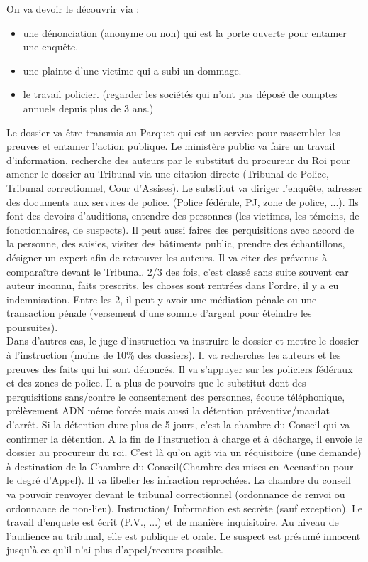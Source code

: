 \documentclass{book}
\begin{document}
On va devoir le découvrir via :

\begin{itemize}
\item une dénonciation (anonyme ou non) qui est la porte ouverte pour entamer une enquête.
\item une plainte d'une victime qui a subi un dommage.
\item le travail policier. (regarder les sociétés qui n'ont pas déposé de comptes annuels depuis plus de 3 ans.)
\end{itemize}

Le dossier va être transmis au Parquet qui est un service pour rassembler les preuves et entamer l'action publique. Le ministère public va faire un travail d'information, recherche des auteurs par le substitut du procureur du Roi pour amener le dossier au Tribunal via une citation directe (Tribunal de Police, Tribunal correctionnel, Cour d'Assises). Le substitut va diriger l'enquête, adresser des documents aux services de police. (Police fédérale, PJ, zone de police, ...). Ils font des devoirs d'auditions, entendre des personnes (les victimes, les témoins, de fonctionnaires, de suspects). Il peut aussi faires des perquisitions avec accord de la personne, des saisies, visiter des bâtiments public, prendre des échantillons, désigner un expert afin de  retrouver les auteurs. Il va citer des prévenus à comparaître devant le Tribunal. 2/3 des fois, c'est classé sans suite souvent car auteur inconnu, faits prescrits, les choses sont rentrées dans l'ordre, il y a eu indemnisation. Entre les 2, il peut y avoir une médiation pénale ou une transaction pénale (versement d'une somme d'argent pour éteindre les poursuites).\\

Dans d'autres cas, le juge d'instruction va instruire le dossier et mettre le dossier à l'instruction (moins de 10\% des dossiers). Il va recherches les auteurs et les preuves des faits qui lui sont dénoncés. Il va s'appuyer sur les policiers fédéraux et des zones de police. Il a plus de pouvoirs que le substitut dont des perquisitions sans/contre le consentement des personnes, écoute téléphonique, prélèvement ADN même forcée mais aussi la détention préventive/mandat d'arrêt. Si la détention dure plus de 5 jours, c'est la chambre du Conseil qui va confirmer la détention. A la fin de l'instruction à charge et à décharge, il envoie le dossier au procureur du roi. C'est là qu'on agit via un réquisitoire (une demande) à destination de la Chambre du Conseil(Chambre des mises en Accusation pour le degré d'Appel). Il va libeller les infraction reprochées. La chambre du conseil va pouvoir renvoyer devant le tribunal correctionnel  (ordonnance de renvoi ou ordonnance de non-lieu). Instruction/ Information est secrète (sauf exception). Le travail d'enquete est écrit (P.V., ...) et de manière inquisitoire. Au niveau de l'audience au tribunal, elle est publique et orale. Le suspect est présumé innocent jusqu'à ce qu'il n'ai plus d'appel/recours possible.\\
\end{document}
